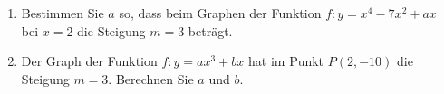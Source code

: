 \begin{enumerate}

    \item Bestimmen Sie \( a \) so, dass beim Graphen der Funktion \( f \colon y = x^4 - 7x^2 + ax \) bei \( x = 2 \) die Steigung \( m = 3 \) beträgt.

    \item Der Graph der Funktion \( f \colon y = ax^3 + bx \) hat im Punkt \( P(2, -10) \) die Steigung \( m = 3 \). Berechnen Sie \( a \) und \( b \).

\end{enumerate}
\clearpage

